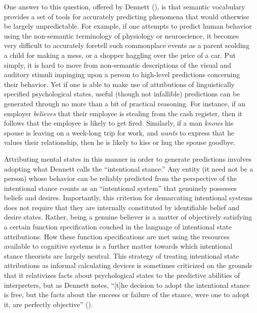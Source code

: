 One answer to this question, offered by Dennett (\citeyear{Dennett:1991,Dennett:1987}), is that semantic vocabulary provides a set of tools for accurately predicting phenomena that would otherwise be largely unpredictable. For example, if one attempts to predict human behavior using the non-semantic terminology of physiology or neuroscience, it becomes very difficult to accurately foretell such commonplace events as a parent scolding a child for making a mess, or a shopper haggling over the price of a car. Put simply, it is hard to move from non-semantic descriptions of the visual and auditory stimuli impinging upon a person to high-level predictions concerning their behavior. Yet if one is able to make use of attributions of linguistically specified psychological states, useful (though not infallible) predictions can be generated through no more than a bit of practical reasoning. For instance, if an employer \textit{believes} that their employee is stealing from the cash register, then it follows that the employee is likely to get fired. Similarly, if a man \textit{knows} his spouse is leaving on a week-long trip for work, and \textit{wants} to express that he values their relationship, then he is likely to kiss or hug the spouse goodbye. 

Attributing mental states in this manner in order to generate predictions involves adopting what Dennett calls the ``intentional stance.'' Any entity (it need not be a person) whose behavior can be reliably predicted from the perspective of the intentional stance counts as an ``intentional system'' that genuinely possesses beliefs and desires. Importantly, this criterion for demarcating intentional systems does not require that they are internally constituted by identifiable belief and desire states. Rather, being a genuine believer is a matter of objectively satisfying a certain function specification couched in the language of intentional state attributions. How these function specifications are met using the resources available to cognitive systems is a further matter towards which intentional stance theorists are largely neutral. This strategy of treating intentional state attributions as informal calculating devices is sometimes criticized on the grounds that it relativizes facts about psychological states to the predictive abilities of interpreters, but as Dennett notes, ``[t]he decision to adopt the intentional stance is free, but the facts about the success or failure of the stance, were one to adopt it, are perfectly objective'' (\citeyear[][p. 24]{Dennett:1987}).

